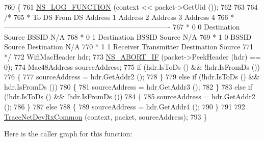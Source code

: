 \begin{DoxyCode}
760 \{
761   \hyperlink{log-macros-disabled_8h_a90b90d5bad1f39cb1b64923ea94c0761}{NS\_LOG\_FUNCTION} (context << packet->GetUid ());
762 
763 
764   \textcolor{comment}{/*}
765 \textcolor{comment}{   *  To DS    From DS   Address 1    Address 2    Address 3    Address 4 }
766 \textcolor{comment}{   *----------------------------------------------------------------------}
767 \textcolor{comment}{   *    0        0       Destination  Source        BSSID         N/A}
768 \textcolor{comment}{   *    0        1       Destination  BSSID         Source        N/A}
769 \textcolor{comment}{   *    1        0       BSSID        Source        Destination   N/A}
770 \textcolor{comment}{   *    1        1       Receiver     Transmitter   Destination   Source}
771 \textcolor{comment}{   */}
772   WifiMacHeader hdr;
773   \hyperlink{group__fatal_ga979468222aa80366c2c98aa1554f3eec}{NS\_ABORT\_IF} (packet->PeekHeader (hdr) == 0);
774   Mac48Address sourceAddress;
775   \textcolor{keywordflow}{if} (hdr.IsToDs () && !hdr.IsFromDs ())
776     \{
777       sourceAddress = hdr.GetAddr2 ();
778     \}
779   \textcolor{keywordflow}{else} \textcolor{keywordflow}{if} (!hdr.IsToDs () && hdr.IsFromDs ())
780     \{
781       sourceAddress = hdr.GetAddr3 ();
782     \}
783   \textcolor{keywordflow}{else} \textcolor{keywordflow}{if} (!hdr.IsToDs () && !hdr.IsFromDs ())
784     \{
785       sourceAddress = hdr.GetAddr2 ();
786     \}
787   \textcolor{keywordflow}{else}
788     \{
789       sourceAddress = hdr.GetAddr4 ();
790     \}
791 
792   \hyperlink{classns3_1_1PyViz_a9b8b6e5900fd7b1bdca524f3f9acc018}{TraceNetDevRxCommon} (context, packet, sourceAddress);
793 \}
\end{DoxyCode}


Here is the caller graph for this function\+:


